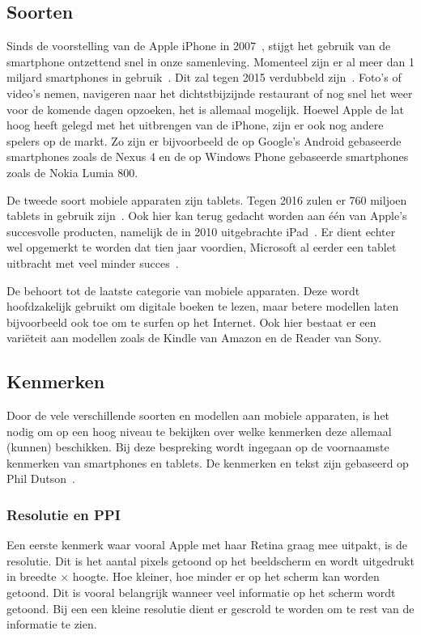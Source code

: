 \subsection{Soorten}
Sinds de voorstelling van de Apple iPhone in 2007~\cite{David2011}, stijgt het gebruik van de smartphone ontzettend snel in onze samenleving.  
Momenteel zijn er al meer dan 1 miljard smartphones in gebruik~\cite{Yang2012}. 
Dit zal tegen 2015 verdubbeld zijn~\cite{Gillett2012}.
Foto's of video's nemen, navigeren naar het dichtstbijzijnde restaurant of nog snel het weer voor de komende dagen opzoeken, het is allemaal mogelijk. 
Hoewel Apple de lat hoog heeft gelegd met het uitbrengen van de iPhone, zijn er ook nog andere spelers op de markt. 
Zo zijn er bijvoorbeeld de op Google's Android gebaseerde smartphones zoals de Nexus 4 en de op Windows Phone gebaseerde smartphones zoals de Nokia Lumia 800.

De tweede soort mobiele apparaten zijn tablets.
Tegen 2016 zulen er 760 miljoen tablets in gebruik zijn~\cite{Gillett2012}.
Ook hier kan terug gedacht worden aan één van Apple's succesvolle producten, namelijk de in 2010 uitgebrachte iPad~\cite{Apple2010}. 
Er dient echter wel opgemerkt te worden dat tien jaar voordien, Microsoft al eerder een tablet uitbracht met veel minder succes~\cite{Microsoft2000}.

De  behoort tot de laatste categorie van mobiele apparaten. 
Deze wordt hoofdzakelijk gebruikt om digitale boeken te lezen, maar betere modellen laten bijvoorbeeld ook toe om te surfen op het Internet. 
Ook hier bestaat er een variëteit aan modellen zoals de Kindle van Amazon en de Reader van Sony.

\subsection{Kenmerken}
Door de vele verschillende soorten en modellen aan mobiele apparaten, is het nodig om op een hoog niveau te bekijken over welke kenmerken deze allemaal (kunnen) beschikken. 
Bij deze bespreking wordt ingegaan op de voornaamste kenmerken van smartphones en tablets. 
De kenmerken en tekst zijn gebaseerd op Phil Dutson~\cite{PhilDutson2012}.

\subsubsection{Resolutie en PPI}
Een eerste kenmerk waar vooral Apple met haar Retina graag mee uitpakt, is de resolutie. 
Dit is het aantal pixels getoond op het beeldscherm en wordt uitgedrukt in breedte $\times$ hoogte. 
Hoe kleiner, hoe minder er op het scherm kan worden getoond. 
Dit is vooral belangrijk wanneer veel informatie op het scherm wordt getoond. 
Bij een een kleine resolutie dient er gescrold te worden om te rest van de informatie te zien.

